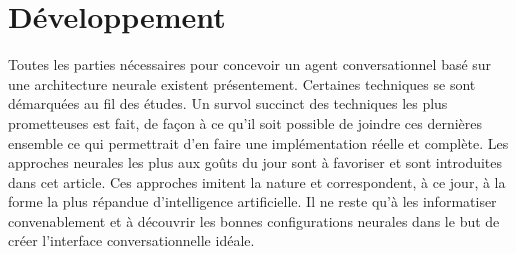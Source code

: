 \section{Développement}
Toutes les parties nécessaires pour concevoir un agent conversationnel basé sur une architecture neurale existent présentement. Certaines techniques se sont démarquées au fil des études. Un survol succinct des techniques les plus prometteuses est fait, de façon à ce qu'il soit possible de joindre ces dernières ensemble ce qui permettrait d'en faire une implémentation réelle et complète. Les approches neurales les plus aux goûts du jour sont à favoriser et sont introduites dans cet article. Ces approches imitent la nature et correspondent, à ce jour, à la forme la plus répandue d'intelligence artificielle. Il ne reste qu'à les informatiser convenablement et à découvrir les bonnes configurations neurales dans le but de créer l'interface conversationnelle idéale. \\






